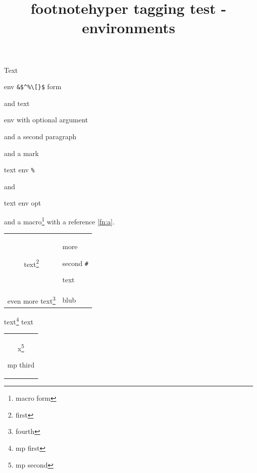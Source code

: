 \documentclass{article}
\title{footnotehyper tagging test - environments}
\begin{document}
Text\begin{footnote}env \verb|&$^%\[}$| form\end{footnote} and
text\begin{footnote}[57]env with optional argument

and a second paragraph\end{footnote} and a mark\footnotemark
\begin{footnotetext}text env \verb|%|\label{fn:a}\end{footnotetext}
and \footnotemark[99]\begin{footnotetext}[99]text env opt\end{footnotetext}
and a macro\footnote{macro form} with a reference \ref{fn:a}.

\begin{savenotes}
\begin{tabular}{cp{3cm}}
text\footnote{first} & more\begin{footnote}second \verb|#|\end{footnote}
 text\footnotemark \\
even more text\footnote[12]{fourth} & blub
\end{tabular}
\end{savenotes}

\begin{minipage}{5cm}
text\footnote{mp first} text
\begin{savenotes}
\begin{tabular}{c}
x\footnote{mp second}\begin{footnote}mp third\end{footnote}
\end{tabular}
\end{savenotes}
\end{minipage}
\end{document}
